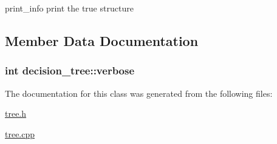 print\+\_\+info print the true structure 



\subsection{Member Data Documentation}
\hypertarget{classdecision__tree_adef4736597a44918d4e221acbfb3142b}{
\subsubsection[{verbose}]{\setlength{\rightskip}{0pt plus 5cm}int decision\+\_\+tree\+::verbose\hspace{0.3cm}{\ttfamily [private]}}}\label{classdecision__tree_adef4736597a44918d4e221acbfb3142b}


The documentation for this class was generated from the following files\+:\begin{DoxyCompactItemize}
\item 
\hyperlink{tree_8h}{tree.\+h}\item 
\hyperlink{tree_8cpp}{tree.\+cpp}\end{DoxyCompactItemize}
